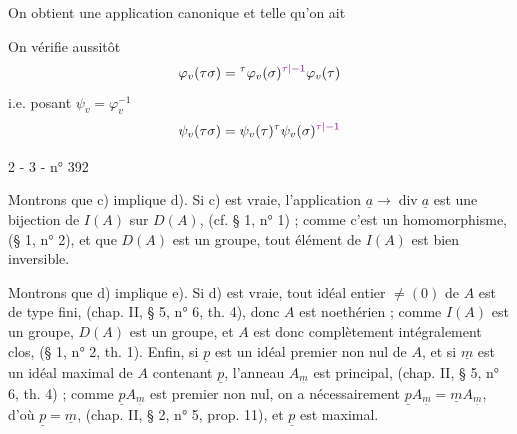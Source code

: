On obtient une application canonique
et telle qu'on ait

On vérifie aussitôt
\[
\varphi_v(\tau\sigma)={}^\tau\varphi_v(\sigma)^{\deleted{\unsure{\tau|-1}}}\varphi_v(\tau)
\]
i.e. posant $\psi_v=\varphi_v^{-1}$
\[
\psi_v(\tau\sigma)=\psi_v(\tau){}^\tau\psi_v(\sigma)^{\deleted{\unsure{\tau|-1}}}
\]

2 - 3 - \hfill n° 392

Montrons que c) implique d). Si c) est vraie, l'application $\underline a\longrightarrow\operatorname{div}\underline a$ est une bijection de $I(A)$ sur $D(A)$, (cf. § 1, n° 1) ; comme c'est un homomorphisme, (§ 1, n° 2), et que $D(A)$ est un groupe, tout élément de $I(A)$ est bien inversible.

Montrons que d) implique e). Si d) est vraie, tout idéal entier $\ne(0)$ de $A$ est de type fini, (chap. II, § 5, n° 6, th. 4), donc $A$ est noethérien ; comme $I(A)$ est un groupe, $D(A)$ est un groupe, et $A$ est donc complètement intégralement clos, (§ 1, n° 2, th. 1). Enfin, si $\underline p$ est un idéal premier non nul de $A$, et si $\underline m$ est un idéal maximal de $A$ contenant $\underline p$, l'anneau $A_{\underline m}$ est principal, (chap. II, § 5, n° 6, th. 4) ; comme $\underline pA_{\underline m}$ est premier non nul, on a nécessairement $\underline pA_{\underline m}=\underline mA_{\underline m}$, d'où $\underline p=\underline m$, (chap. II, § 2, n° 5, prop. 11), et $\underline p$ est maximal.

